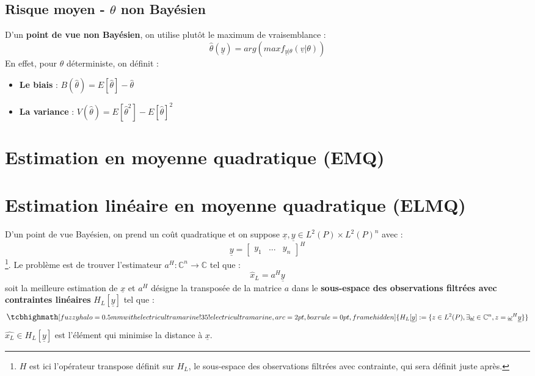 \subsection{Risque moyen - $\theta$ non Bayésien}
D'un \textbf{point de vue non Bayésien}, on utilise plutôt le maximum de vraisemblance : 
\Large
\begin{equation}
    \widehat{\theta}(\underline{y}) = arg (max f_{\underline{y} | \theta}(\underline{v}| \theta)) \nonumber
\end{equation}
\normalsize
En effet, pour $\theta$ déterministe, on définit :
\begin{itemize}
    \item \textbf{Le biais} : $B(\widehat{\theta}) = E[\widehat{\theta}] - \widehat{\theta}$
    \item \textbf{La variance} : $V(\widehat{\theta}) = E[\widehat{\theta}^{2}] - E[\widehat{\theta}]^{2}$
\end{itemize}
\newpage
\section{Estimation en moyenne quadratique (EMQ)}

\newpage
\section{Estimation linéaire en moyenne quadratique (ELMQ)}
\noindent D'un point de vue Bayésien, on prend un coût quadratique et on suppose $\underline{x}, \underline{y} \in L^{2}(P) \times L^{2}(P)^{n}$ avec :
\[
\underline{y} = 
\begin{bmatrix}
    y_{1} & ... & y_{n}    
\end{bmatrix}
^{H}\] \footnote{$H$ est ici l'opérateur transpose définit sur $H_{L}$, le sous-espace des observations filtrées avec contrainte, qui sera définit juste après.}. Le problème est de trouver l'estimateur $a^{H} : \mathbb{C}^{n} \longrightarrow \mathbb{C}$ tel que : 
\begin{equation}
    \widehat{x}_{L} = a^{H}\underline{y} \nonumber
\end{equation} 
soit la meilleure estimation de $\underline{x}$ et $a^{H}$ désigne la transposée de la matrice $a$ dans le \textbf{sous-espace des observations filtrées avec contraintes linéaires} $H_{L}[\underline{y}]$ tel que : 
\begin{equation}
    \large
    \tcbhighmath[fuzzy halo=0.5mm with electricultramarine!35!electricultramarine,arc=2pt,
    boxrule=0pt,frame hidden]{ 
        H_{L}[\underline{y}] := \{z \in L^{2}(P), \exists \underline{\omega} \in \mathbb{C}^{n}, z = \underline{\omega}^{H}\underline{y}\}
    } \nonumber
    \normalsize
\end{equation}
$\widehat{x_{L}} \in H_{L}[\underline{y}]$ est l'élément qui minimise la distance à $\underline{x}$.

